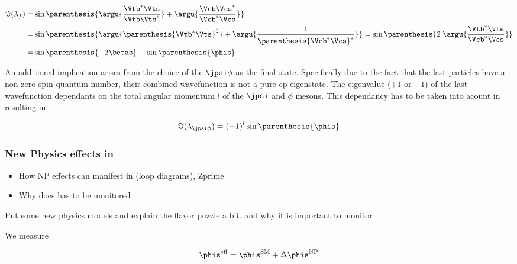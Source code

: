 \begin{align}
  \centering
 \Im(\lambda_f) =& \sin\parenthesis{ \argu{\frac{\Vtb^*\Vts}{\Vtb\Vts^*}} + \argu{\frac{\Vcb\Vcs^*}{\Vcb^*\Vcs}} } \nonumber \\
                =& \sin\parenthesis{ \argu{\parenthesis{\Vtb^*\Vts}^2}    + \argu{\frac{1}{\parenthesis{\Vcb^*\Vcs}^2}} }
                = \sin\parenthesis{  2 \; \argu{\frac{\Vtb^*\Vts}{\Vcb^*\Vcs}} } \nonumber \\
                =& \sin\parenthesis{-2\betas}
                \equiv \sin\parenthesis{\phis}
 \label{phis_def}
\end{align}

\noindent An additional implication arises from the choice of the $\jpsi\phi$ as the final state.
Specifically due to the fact that the last particles have a non zero spin quantum number, their combined wavefunction
is not a pure cp eigenstate. The eigenvalue ($+1$ or $-1$) of the last wavefunction dependants on the total angular momentum
$l$ of the $\jpsi$ and $\phi$ mesons. This dependancy has to be taken into acount in  resulting in 

\begin{equation}
 \Im(\lambda_{\jpsi\phi}) = (-1)^l\sin\parenthesis{\phis}
 \label{phis_jpsiphi_def}
\end{equation}

\subsubsection{New Physics effects in \phis}

\begin{itemize}
 \item How NP effects can manifest in \phis (loop diagrams), Zprime
 \item Why does \phis has to be monitored
\end{itemize}

{\color{red} Put some new physics models and explain the flavor puzzle a bit. and why it is important to monitor \phis}

We measure

\begin{equation}
 \phis^{\text {eff}} = \phis^{\tiny \text{SM}} + \Delta\phis^{\tiny \text{NP}}
 \label{phis_meas}
\end{equation}

